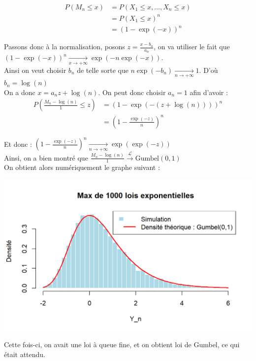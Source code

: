 \documentclass{article}
\theoremstyle{plain}
\theoremstyle{definition}
\theoremstyle{plain}
\begin{document}
\begin{align*}
	P(M_n \leq x) &= P(X_1 \leq x, \dots, X_n \leq x) \\
	&= P(X_1 \leq x)^n \\
	&= (1-\exp(- x))^n
\end{align*}

\noindent Passons donc à la normalisation, posons $z=\frac{x-b_n}{a_n}$, on va utiliser le fait que $(1-\exp(- x))^n \xrightarrow[x \to +\infty]{} \exp(-n\exp(-x)) $. \\
\noindent Ainsi on veut choisir $b_n$ de telle sorte que $n \exp(-b_n) \xrightarrow[n \to +\infty]{} 1 $. D'où $b_n = \log(n)$ \\
\noindent On a donc $ x = a_n z + \log(n) $. On peut donc choisir $ a_n = 1$ afin d'avoir : 
\begin{align*}
	P(\frac{M_n - \log(n)}{1} \leq z) &= (1 - \exp(-(z+\log(n))))^n \\
	&= (1 - \frac{\exp(-z)}{n})^n 
\end{align*}

\noindent Et donc : $ (1 - \frac{\exp(-z)}{n})^n \xrightarrow[n \to +\infty]{} \exp(\exp(-z))$ \\

\noindent Ainsi, on a bien montré que $\frac{M_n - \log(n)}{1} \xrightarrow{\mathcal{L}} \text{Gumbel}(0,1) $ \\

\noindent On obtient alors numériquement le graphe suivant :

\begin{center}
	\includegraphics[scale=0.8]{./images/Max_Expo.png} 
\end{center}

\noindent Cette fois-ci, on avait une loi à queue fine, et on obtient loi de Gumbel, ce qui était attendu.
\end{document}
